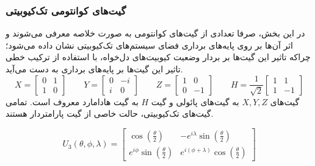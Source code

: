 \subsubsection{
    گیت‌های کوانتومی تک‌کیوبیتی
}
در این بخش، صرفا تعدادی از گیت‌های کوانتومی به صورت خلاصه معرفی می‌شوند و اثر آن‌ها بر روی پایه‌های برداری فضای سیستم‌های تک‌کیوبیتی نشان داده می‌شود؛ چراکه تاثیر این گیت‌ها بر بردار وضعیت کیوبیت‌های دل‌خواه، با استفاده از ترکیب خطی تاثیر این گیت‌ها بر پایه‌های برداری به دست می‌آید.
\begin{equation}
X = \begin{bmatrix} 0 & 1 \\ 1 & 0 \end{bmatrix} \qquad
Y = \begin{bmatrix} 0 & -i \\ i & 0 \end{bmatrix} \qquad
Z = \begin{bmatrix} 1 & 0 \\ 0 & -1 \end{bmatrix} \qquad
H = \frac{1}{\sqrt{2}} \begin{bmatrix} 1 & 1 \\ 1 & -1 \end{bmatrix}
\end{equation}
گیت‌های 
$X, Y, Z$
به گیت‌های پائولی
و گیت
$H$
به گیت هادامارد
معروف است.
تمامی گیت‌های تک‌کیوبیتی، حالت خاصی از گیت پارامتردار 
هستند.

\begin{equation}
U_3(\theta, \phi, \lambda) = \begin{bmatrix} \cos(\frac{\theta}{2}) & -e^{i\lambda}\sin(\frac{\theta}{2}) \\[6pt]
            e^{i\phi}\sin(\frac{\theta}{2}) & e^{i(\phi+\lambda)}\cos(\frac{\theta}{2})
     \end{bmatrix}
\end{equation}

